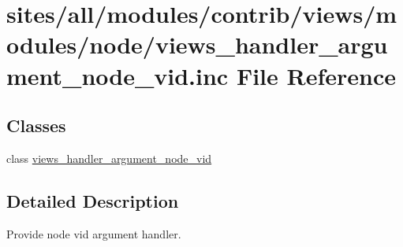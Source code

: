 \hypertarget{views__handler__argument__node__vid_8inc}{
\section{sites/all/modules/contrib/views/modules/node/views\_\-handler\_\-argument\_\-node\_\-vid.inc File Reference}
\label{views__handler__argument__node__vid_8inc}
}
\subsection*{Classes}
\begin{CompactItemize}
\item 
class \hyperlink{classviews__handler__argument__node__vid}{views\_\-handler\_\-argument\_\-node\_\-vid}
\end{CompactItemize}


\subsection{Detailed Description}
Provide node vid argument handler. 
